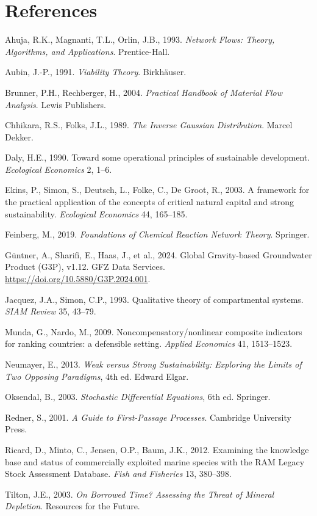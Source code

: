 \documentclass[11pt]{article}
\begin{document}
\section*{References}

Ahuja, R.K., Magnanti, T.L., Orlin, J.B., 1993. \emph{Network Flows: Theory, Algorithms, and Applications}. Prentice-Hall.

Aubin, J.-P., 1991. \emph{Viability Theory}. Birkh\"auser.

Brunner, P.H., Rechberger, H., 2004. \emph{Practical Handbook of Material Flow Analysis}. Lewis Publishers.

Chhikara, R.S., Folks, J.L., 1989. \emph{The Inverse Gaussian Distribution}. Marcel Dekker.

Daly, H.E., 1990. Toward some operational principles of sustainable development. \emph{Ecological Economics} 2, 1--6.

Ekins, P., Simon, S., Deutsch, L., Folke, C., De Groot, R., 2003. A framework for the practical application of the concepts of critical natural capital and strong sustainability. \emph{Ecological Economics} 44, 165--185.

Feinberg, M., 2019. \emph{Foundations of Chemical Reaction Network Theory}. Springer.

G\"untner, A., Sharifi, E., Haas, J., et al., 2024. Global Gravity-based Groundwater Product (G3P), v1.12. GFZ Data Services. \url{https://doi.org/10.5880/G3P.2024.001}.

Jacquez, J.A., Simon, C.P., 1993. Qualitative theory of compartmental systems. \emph{SIAM Review} 35, 43--79.

Munda, G., Nardo, M., 2009. Noncompensatory/nonlinear composite indicators for ranking countries: a defensible setting. \emph{Applied Economics} 41, 1513--1523.

Neumayer, E., 2013. \emph{Weak versus Strong Sustainability: Exploring the Limits of Two Opposing Paradigms}, 4th ed. Edward Elgar.

Oksendal, B., 2003. \emph{Stochastic Differential Equations}, 6th ed. Springer.

Redner, S., 2001. \emph{A Guide to First-Passage Processes}. Cambridge University Press.

Ricard, D., Minto, C., Jensen, O.P., Baum, J.K., 2012. Examining the knowledge base and status of commercially exploited marine species with the RAM Legacy Stock Assessment Database. \emph{Fish and Fisheries} 13, 380--398.

Tilton, J.E., 2003. \emph{On Borrowed Time? Assessing the Threat of Mineral Depletion}. Resources for the Future.
\end{document}
